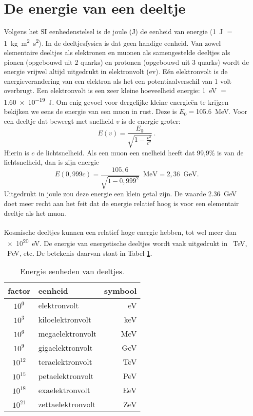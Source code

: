 \section{De energie van een deeltje}
Volgens het SI eenhedenstelsel is de joule (J) de eenheid van energie (\SI{1}{\joule} $=$ \SI{1}{kg m^2 s^2}). In de deeltjesfysica is dat geen handige eenheid. Van zowel elementaire deeltjes als elektronen en muonen als samengestelde deeltjes als pionen (opgebouwd uit 2 quarks) en protonen (opgebouwd uit 3 quarks) wordt de energie vrijwel altijd uitgedrukt in elektronvolt (ev). E\'en elektronvolt is de energieverandering van een elektron als het een potentiaalverschil van 1 volt overbrugt. Een elektronvolt is een zeer kleine hoeveelheid energie: \SI{1}{\electronvolt} $=$ \SI{1,60e-19}{\joule}. Om enig gevoel voor dergelijke kleine energie\"en te krijgen bekijken we eens de energie van een muon in rust. Deze is $E_0=$\SI{105,6}{\mega\electronvolt}. Voor een deeltje dat beweegt met snelheid $v$ is de energie groter:
\begin{equation}
E(v)=\frac{E_0}{\sqrt{1-\frac{v^2}{c^2}}} \ . \nonumber
\end{equation}
Hierin is $c$ de lichtsnelheid. Als een muon een snelheid heeft dat 99,9\% is van de lichtsnelheid, dan is zijn energie 
\begin{equation}
E(0,999c)=\frac{105,6}{\sqrt{1-0,999^2}} \, \textrm{ MeV} =2,36 \, \textrm{ GeV}. \nonumber
\end{equation}
Uitgedrukt in joule zou deze energie een klein getal zijn. De waarde \SI{2,36}{\giga\electronvolt} doet meer recht aan het feit dat de energie relatief hoog is voor een elementair deeltje als het muon. 
\\ \\
Kosmische deeltjes kunnen een relatief hoge energie hebben, tot wel meer dan \SI{e20}{\electronvolt}.
De energie van energetische deeltjes wordt vaak uitgedrukt in \SI{}{\tera\electronvolt}, \SI{}{\peta\electronvolt}, etc. De betekenis daarvan staat in Tabel \ref{eenheden}.
\begin{table}
\begin{center}
\begin{tabular}{|c|l|r|} \hline
factor & eenheid & symbool \\ \hline
$10^0$ & elektronvolt & eV \\
$10^3$ & kiloelektronvolt & keV \\
$10^6$ & megaelektronvolt & MeV \\
$10^9$ & gigaelektronvolt & GeV \\
$10^{12}$ & teraelektronvolt & TeV \\
$10^{15}$ & petaelektronvolt & PeV \\
$10^{18}$ & exaelektronvolt & EeV \\
$10^{21}$ & zettaelektronvolt & ZeV \\ \hline
\end{tabular}
\end{center}
\caption{Energie eenheden van deeltjes.}
\label{eenheden}
\end{table}

